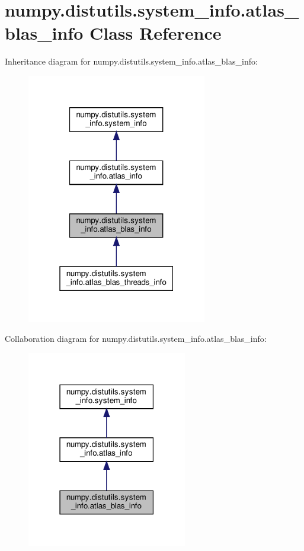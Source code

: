 \hypertarget{classnumpy_1_1distutils_1_1system__info_1_1atlas__blas__info}{}\section{numpy.\+distutils.\+system\+\_\+info.\+atlas\+\_\+blas\+\_\+info Class Reference}
\label{classnumpy_1_1distutils_1_1system__info_1_1atlas__blas__info}


Inheritance diagram for numpy.\+distutils.\+system\+\_\+info.\+atlas\+\_\+blas\+\_\+info\+:
\nopagebreak
\begin{figure}[H]
\begin{center}
\leavevmode
\includegraphics[width=223pt]{classnumpy_1_1distutils_1_1system__info_1_1atlas__blas__info__inherit__graph}
\end{center}
\end{figure}


Collaboration diagram for numpy.\+distutils.\+system\+\_\+info.\+atlas\+\_\+blas\+\_\+info\+:
\nopagebreak
\begin{figure}[H]
\begin{center}
\leavevmode
\includegraphics[width=198pt]{classnumpy_1_1distutils_1_1system__info_1_1atlas__blas__info__coll__graph}
\end{center}
\end{figure}
